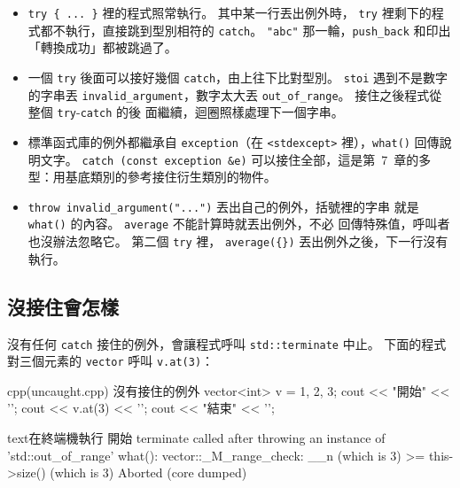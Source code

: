 
\begin{itemize}
\item \texttt{try \{ ... \}} 裡的程式照常執行。 其中某一行丟出例外時，
\texttt{try} 裡剩下的程式都不執行，直接跳到型別相符的 \texttt{catch}。
\texttt{"abc"} 那一輪，\texttt{push\_back} 和印出「轉換成功」都被跳過了。
\item 一個 \texttt{try} 後面可以接好幾個 \texttt{catch}，由上往下比對型別。
\texttt{stoi} 遇到不是數字的字串丟 \texttt{invalid\_argument}，數字太大丟
\texttt{out\_of\_range}。 接住之後程式從整個 \texttt{try}-\texttt{catch} 的後
面繼續，迴圈照樣處理下一個字串。
\item 標準函式庫的例外都繼承自 \texttt{exception}（在 \texttt{<stdexcept>}
裡），\texttt{what()} 回傳說明文字。 \texttt{catch (const exception \&e)}
可以接住全部，這是第~7~章的多型：用基底類別的參考接住衍生類別的物件。
\item \texttt{throw invalid\_argument("...")} 丟出自己的例外，括號裡的字串
就是 \texttt{what()} 的內容。 \texttt{average} 不能計算時就丟出例外，不必
回傳特殊值，呼叫者也沒辦法忽略它。 第二個 \texttt{try} 裡，
\texttt{average(\{\})} 丟出例外之後，下一行沒有執行。
\end{itemize}

\subsection{沒接住會怎樣}

沒有任何 \texttt{catch} 接住的例外，會讓程式呼叫 \texttt{std::terminate}
中止。 下面的程式對三個元素的 \texttt{vector} 呼叫 \texttt{v.at(3)}：

\begin{code}{cpp}{(uncaught.cpp) 沒有接住的例外}
vector<int> v = {1, 2, 3};
cout << "開始" << '\n';
cout << v.at(3) << '\n';
cout << "結束" << '\n';
\end{code}

\begin{code}{text}{在終端機執行}
開始
terminate called after throwing an instance of 'std::out_of_range'
  what():  vector::_M_range_check: __n (which is 3) >= this->size() (which is 3)
Aborted (core dumped)
\end{code}

